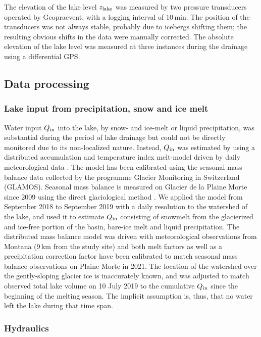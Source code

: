 The elevation of the lake level $z_{\rm lake }$ was measured by two pressure transducers operated by Geopraevent, with a logging interval of 10\,min. The position of the transducers was not always stable, probably due to icebergs shifting them; the resulting obvious shifts in the data were manually corrected. The absolute elevation of the lake level was measured at three instances during the drainage using a differential GPS.
%

\subsection{Data processing}


\subsubsection{Lake input from precipitation, snow and ice melt}

Water input $Q_{\rm in}$ into the lake, by snow- and ice-melt or liquid precipitation, was substantial during the period of lake drainage but could not be directly monitored due to its non-localized nature.
%
Instead, $Q_{\rm in}$ was estimated by using a distributed accumulation and temperature index melt-model driven by daily meteorological data \citep{Hock1999,Huss&al2015a}. The model has been calibrated using the seasonal mass balance data collected by the programme Glacier Monitoring in Switzerland  (GLAMOS). Seasonal mass balance is measured on Glacier de la Plaine Morte since 2009 using the direct glaciological method \citep{GlaciologicalReport2020}. We applied the model from September 2018 to September 2019 with a daily resolution to the watershed of the lake, and used it to estimate $Q_{\rm in}$ consisting of snowmelt from the glacierized and ice-free portion of the basin, bare-ice melt and liquid precipitation. The distributed mass balance model \citep[e.g.][]{Huss&al2021} was driven with meteorological observations from Montana (9\,km from the study site) and both melt factors as well as a precipitation correction factor have been calibrated to match seasonal mass balance observations on Plaine Morte in 2021. The location of the watershed over the gently-sloping glacier ice is inaccurately known, and was adjusted to match observed total lake volume on 10 July 2019 to the cumulative $Q_{\rm in}$ since the beginning of the melting season. The implicit assumption is, thus, that no water left the lake during that time span.


\subsubsection{Hydraulics}
\label{subsubsection:Hydraulics}

